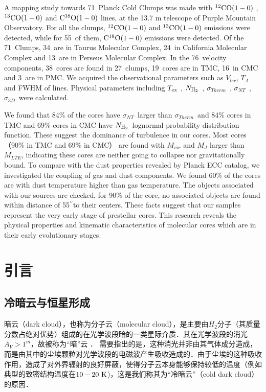 \documentclass[UTF8, nocolorlinks]{pkuthss}
\newcommand{\coaa}{$\rm^{12}CO(1-0)$ }
\newcommand{\cobb}{$\rm^{13}CO(1-0)$ }
\newcommand{\cocc}{$\rm C^{18}O(1-0)$ }
\newcommand{\texc}{$T_{\rm {ex}}$ }
\newcommand{\nhyd}{$N_{\rm H_2}$\ }
\newcommand{\sigmath}{$\sigma _{Therm}$\ }
\newcommand{\sigmant}{$\sigma _{NT}$\ }
\newcommand{\sigmatd}{$\sigma _{3D}$\ }
\newcommand{\arcsec}{$^{\prime\prime}$}
\newcommand{\numsou}{71\ }
\newcommand{\numsoutmc}{34\ }
\newcommand{\numsoupmc}{13\ }
\newcommand{\numsoucmc}{24\ }
\newcommand{\numcore}{38\ }
\newcommand{\numcoretmc}{19\ }
\newcommand{\numcorepmc}{3\ }
\newcommand{\numcorecmc}{16\ }
\newcommand{\numcocc}{55\ }
\newcommand{\numcompofcores}{27\ }
\newcommand{\numvelcomp}{76\ }
\begin{document}
\begin{eabstract}

	A mapping study towards \numsou Planck Cold Clumps was made with \coaa, \cobb and \cocc lines, at the 13.7 m telescope of Purple Mountain Observatory. For all the clumps, \coaa and \cobb emissions were detected, while for \numcocc of them, \cocc emissions were detected.  Of the \numsou Clumps, \numsoutmc are in Taurus Molecular Complex, \numsoucmc in California  Molecular Complex and \numsoupmc are in Perseus Molecular Complex. In the \numvelcomp velocity components, \numcore cores are found in \numcompofcores clumps, \numcoretmc cores are in TMC, \numcorecmc in CMC and \numcorepmc are in PMC.
    We acquired the observational parameters such as $V_{lsr}$, $T_{A}$ and FWHM of lines. Physical parameters including \texc, \nhyd, \sigmath, \sigmant,  \sigmatd were calculated.

    We found that 84\% of the cores have \sigmant larger than \sigmath and 84\% cores in TMC and 69\% cores in CMC have \nhyd lognormal probability distribution function. These suggest the dominance of turbulence in our cores. Most cores （90\% in TMC and 69\% in CMC） are found with $M_{vir}$ and $M_J$ larger than $M_{LTE}$, indicating these cores are neither going to collapse nor gravitationally bound. To compare with the dust properties revealed by Planck ECC catalog, we investigated the coupling of gas and dust components. We found 60\% of the cores are with dust temperature higher than gas temperature. The objects associated with our sources are checked, for 90\% of the core, no associated objects are found within distance of 55\arcsec to their centers. These facts suggest that our samples represent the very early stage of prestellar cores. This research reveals the physical properties and kinematic characteristics of molecular cores which are in their early evolutionary stages.
\end{eabstract}

	\tableofcontents
	\mainmatter

\chapter{引言}

	\section{冷暗云与恒星形成}\label{Sec.ColdDarkCloud}

		暗云（dark cloud），也称为分子云（molecular cloud），是主要由$H_2$分子（其质量分数占绝对优势）组成的在光学波段暗的一类星际介质．其在光学波段的消光$A_V>1^{m}$，故被称为“暗”云\supercite{2007ARA&A..45..339B} ． 需要指出的是，这种消光并非由其气体成分造成，而是由其中的尘埃颗粒对光学波段的电磁波产生吸收造成的．由于尘埃的这种吸收作用，造成了对外界辐射的良好屏蔽，使得分子云本身能够保持较低的温度（例如典型的致密结构温度在$10-20\rm\ K$\supercite{1983ApJ...265..223B})，这是我们称其为“冷暗云”（cold dark cloud）的原因．
\end{document}
